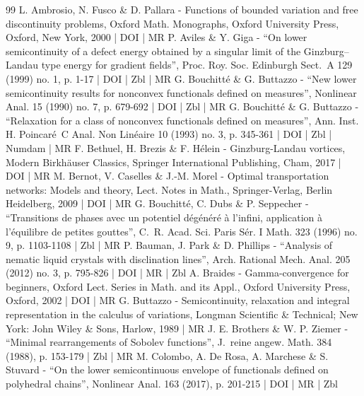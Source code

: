 \documentclass[10pt]{amsart}
\theoremstyle{plain}
\theoremstyle{definition}
\begin{document}
\begin{thebibliography}{99}
L. Ambrosio, N. Fusco \& D. Pallara - Functions of bounded variation and free discontinuity problems, Oxford Math. Monographs, Oxford University Press, Oxford, New York, 2000 | DOI | MR
P. Aviles \& Y. Giga - “On lower semicontinuity of a defect energy obtained by a singular limit of the Ginzburg–Landau type energy for gradient fields”, Proc. Roy. Soc. Edinburgh Sect. A 129 (1999) no. 1, p. 1-17 | DOI | Zbl | MR
G. Bouchitté \& G. Buttazzo - “New lower semicontinuity results for nonconvex functionals defined on measures”, Nonlinear Anal. 15 (1990) no. 7, p. 679-692 | DOI | Zbl | MR
G. Bouchitté \& G. Buttazzo - “Relaxation for a class of nonconvex functionals defined on measures”, Ann. Inst. H. Poincaré C Anal. Non Linéaire 10 (1993) no. 3, p. 345-361 | DOI | Zbl | Numdam | MR
F. Bethuel, H. Brezis \& F. Hélein - Ginzburg-Landau vortices, Modern Birkhäuser Classics, Springer International Publishing, Cham, 2017 | DOI | MR
M. Bernot, V. Caselles \& J.-M. Morel - Optimal transportation networks: Models and theory, Lect. Notes in Math., Springer-Verlag, Berlin Heidelberg, 2009 | DOI | MR
G. Bouchitté, C. Dubs \& P. Seppecher - “Transitions de phases avec un potentiel dégénéré à l’infini, application à l’équilibre de petites gouttes”, C. R. Acad. Sci. Paris Sér. I Math. 323 (1996) no. 9, p. 1103-1108 | Zbl | MR
P. Bauman, J. Park \& D. Phillips - “Analysis of nematic liquid crystals with disclination lines”, Arch. Rational Mech. Anal. 205 (2012) no. 3, p. 795-826 | DOI | MR | Zbl
A. Braides - Gamma-convergence for beginners, Oxford Lect. Series in Math. and its Appl., Oxford University Press, Oxford, 2002 | DOI | MR
G. Buttazzo - Semicontinuity, relaxation and integral representation in the calculus of variations, Longman Scientific \& Technical; New York: John Wiley \& Sons, Harlow, 1989 | MR
J. E. Brothers \& W. P. Ziemer - “Minimal rearrangements of Sobolev functions”, J. reine angew. Math. 384 (1988), p. 153-179 | Zbl | MR
M. Colombo, A. De Rosa, A. Marchese \& S. Stuvard - “On the lower semicontinuous envelope of functionals defined on polyhedral chains”, Nonlinear Anal. 163 (2017), p. 201-215 | DOI | MR | Zbl

\end{thebibliography}
\end{document}
